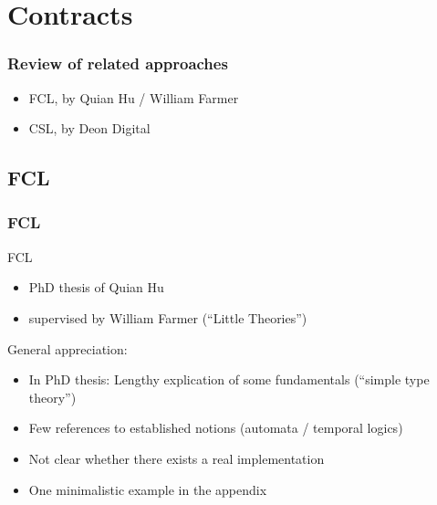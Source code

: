 \documentclass{beamer}
\begin{document}
\section{Contracts}


\begin{frame}[fragile]\frametitle{Review of related approaches}

  \begin{itemize}
  \item FCL, by Quian Hu / William Farmer
  \item CSL, by Deon Digital
  \end{itemize}

\end{frame}

\subsection{FCL}

\begin{frame}[fragile]\frametitle{FCL}

  FCL
  \begin{itemize}
  \item PhD thesis of Quian Hu
  \item supervised by William Farmer (``Little Theories'')
  \end{itemize}

  \vspace{5mm}
  General appreciation:
  \begin{itemize}
  \item In PhD thesis: Lengthy explication of some fundamentals (``simple type
    theory'')
  \item Few references to established notions (automata / temporal logics)
  \item Not clear whether there exists a real implementation 
  \item One minimalistic example in the appendix
  \end{itemize}


\end{frame}
\end{document}

